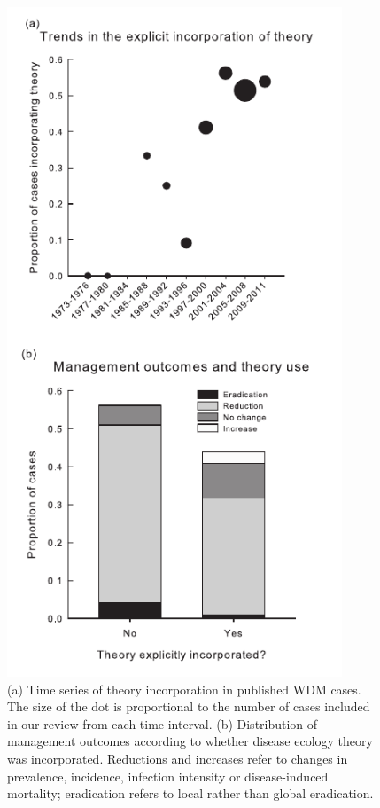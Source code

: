 \begin{figure}
	\caption[Temporal trends in the application of theory, and reported management outcome distributions]{
 (a) Time series of theory incorporation in published WDM cases. The size of the dot is proportional to the number of cases included in our review from each time interval. (b) Distribution of management outcomes according to whether disease ecology theory was incorporated. Reductions and increases refer to changes in prevalence, incidence, infection intensity or disease-induced mortality; eradication refers to local rather than global eradication.
	}
    \begin{center}
	\includegraphics[width=100mm]{figs/ch1/WDMf2.pdf}
    \end{center}
\label{1-2}
\end{figure}


